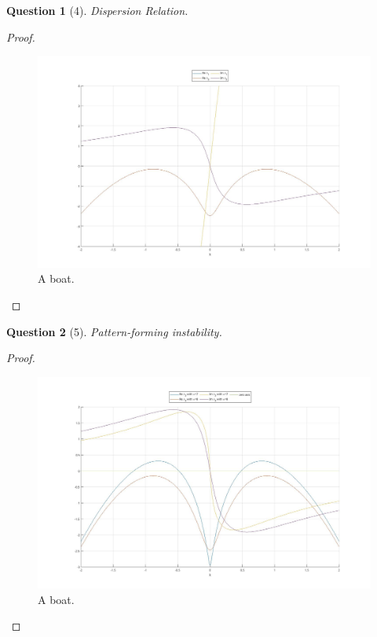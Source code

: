 \documentclass[11pt]{article}
\theoremstyle{quest}
\newtheorem*{question}{Question}
\begin{document}
\begin{question}[4]
    Dispersion Relation. 
\end{question}
\begin{proof}
    \begin{figure}[b!]
        \includegraphics[width=\linewidth]{figures/Q4_fig1.jpg}
        \caption{A boat.}
        \label{fig:boat1}
    \end{figure}

     

\end{proof}

\begin{question}[5]
   Pattern-forming instability. 
\end{question}
\begin{proof}
    \begin{figure}[b!]
        \includegraphics[width=\linewidth]{figures/Q5_fig1.jpg}
        \caption{A boat.}
        \label{fig:fig2}
    \end{figure}

     
    
\end{proof}
\end{document}
